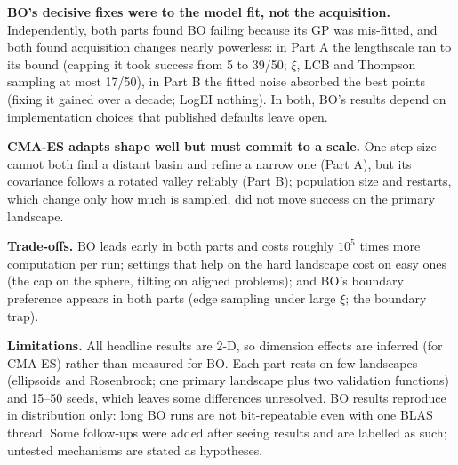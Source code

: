 \documentclass[10pt,a4paper]{article}
\begin{document}
\textbf{BO's decisive fixes were to the model fit, not the acquisition.} Independently, both parts found BO
failing because its GP was mis-fitted, and both found acquisition changes nearly powerless: in Part A the lengthscale
ran to its bound (capping it took success from 5 to 39/50; $\xi$, LCB and Thompson sampling at most 17/50), in Part B
the fitted noise absorbed the best points (fixing it gained over a decade; LogEI nothing). In both, BO's
results depend on implementation choices that published defaults leave open.

\textbf{CMA-ES adapts shape well but must commit to a scale.} One step size cannot both find a distant basin and refine a
narrow one (Part A), but its covariance follows a rotated valley reliably (Part B); population size and restarts,
which change only how much is sampled, did not move success on the primary landscape.

\textbf{Trade-offs.} BO leads early in both parts and costs roughly $10^5$ times more computation per run; settings
that help on the hard landscape cost on easy ones (the cap on the sphere, tilting on aligned problems); and BO's
boundary preference appears in both parts (edge sampling under large $\xi$; the boundary trap).

\textbf{Limitations.} All headline results are 2-D, so dimension effects are inferred (for CMA-ES) rather than
measured for BO. Each part rests on few landscapes (ellipsoids and Rosenbrock; one primary landscape plus two validation
functions) and 15--50 seeds, which leaves some differences unresolved. BO results reproduce in distribution only: long
BO runs are not bit-repeatable even with one BLAS thread. Some follow-ups were added after seeing results and are
labelled as such; untested mechanisms are stated as hypotheses.

\small


\end{document}
